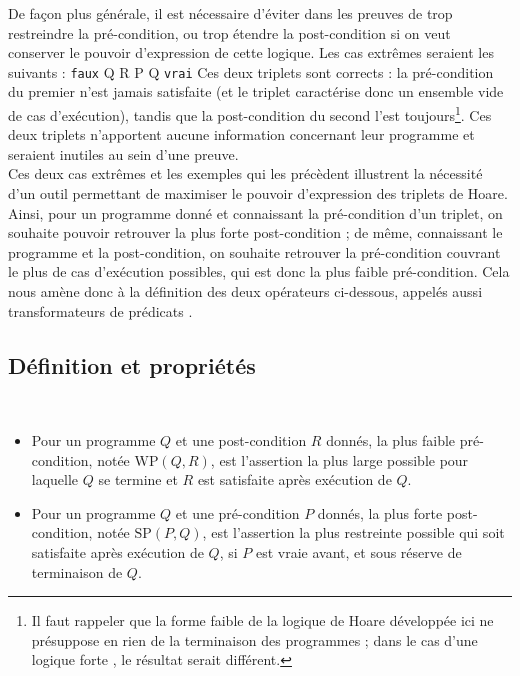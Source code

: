 De façon plus générale, il est nécessaire d'éviter dans les preuves de trop restreindre la pré-condition, ou trop étendre la post-condition si on veut conserver le pouvoir d'expression de cette logique. Les cas extrêmes seraient les suivants :
  \hbegin \texttt{faux} \ha Q \hb R \hend
  \hbegin P \ha Q \hb \texttt{vrai} \hend
Ces deux triplets sont corrects : la pré-condition du premier n'est jamais satisfaite (et le triplet caractérise donc un ensemble vide de cas d'exécution), tandis que la post-condition du second l'est toujours\footnote{Il faut rappeler que la forme \og faible \fg{} de la logique de Hoare développée ici ne présuppose en rien de la terminaison des programmes ; dans le cas d'une logique \og forte \fg{}, le résultat serait différent.}. Ces deux triplets n'apportent aucune information concernant leur programme et seraient inutiles au sein d'une preuve.\\

Ces deux cas extrêmes et les exemples qui les précèdent illustrent la nécessité d'un outil permettant de maximiser le pouvoir d'expression des triplets de Hoare. Ainsi, pour un programme donné et connaissant la pré-condition d'un triplet, on souhaite pouvoir retrouver la plus forte post-condition ; de même, connaissant le programme et la post-condition, on souhaite retrouver la pré-condition couvrant le plus de cas d'exécution possibles, qui est donc la plus faible pré-condition. Cela nous amène donc à la définition des deux opérateurs ci-dessous, appelés aussi transformateurs de prédicats \cite{dijkstra-75,moeller-04}.

\subsection{Définition et propriétés}
\begin{definition}\ 
\begin{itemize}
  \item Pour un programme $Q$ et une post-condition $R$ donnés, la plus faible pré-condition, notée $\mathrm{WP}(Q, R)$, est l'assertion la plus large possible pour laquelle $Q$ se termine et $R$ est satisfaite après exécution de $Q$.
  \item Pour un programme $Q$ et une pré-condition $P$ donnés, la plus forte post-condition, notée $\mathrm{SP}(P, Q)$, est l'assertion la plus restreinte possible qui soit satisfaite après exécution de $Q$, si $P$ est vraie avant, et sous réserve de terminaison de $Q$.
\end{itemize}
\end{definition}

